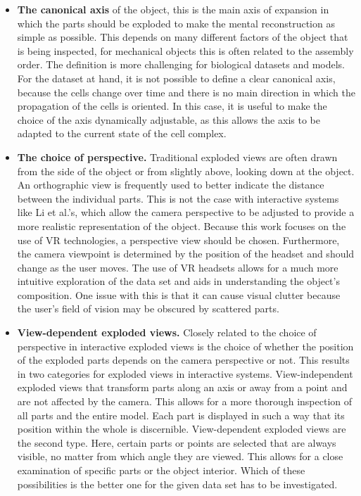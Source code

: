 \begin{itemize}
	\item \textbf{The canonical axis} of the object, this is the main axis of expansion in which the parts should be exploded to make the mental reconstruction as simple as possible. This depends on many different factors of the object that is being inspected, for mechanical objects this is often related to the assembly order. The definition is more challenging for biological datasets and models. For the dataset at hand, it is not possible to define a clear canonical axis, because the cells change over time and there is no main direction in which the propagation of the cells is oriented. In this case, it is useful to make the choice of the axis dynamically adjustable, as this allows the axis to be adapted to the current state of the cell complex. 
	\item \textbf{The choice of perspective.} Traditional exploded views are often drawn from the side of the object or from slightly above, looking down at the object. An orthographic view is frequently used to better indicate the distance between the individual parts. 
	This is not the case with interactive systems like Li et al.'s, which allow the camera perspective to be adjusted to provide a more realistic representation of the object.\cite{Wilmot_Li_2008}
	Because this work focuses on the use of VR technologies, a perspective view should be chosen. 
	Furthermore, the camera viewpoint is determined by the position of the headset and should change as the user moves. 
	The use of VR headsets allows for a much more intuitive exploration of the data set and aids in understanding the object's composition. 
	One issue with this is that it can cause visual clutter because the user's field of vision may be obscured by scattered parts.
	\item \textbf{View-dependent exploded views.} Closely related to the choice of perspective in interactive exploded views is the choice of whether the position of the exploded parts depends on the camera perspective or not. 
	This results in two categories for exploded views in interactive systems.
	View-independent exploded views that transform parts along an axis or away from a point and are not affected by the camera.
	This allows for a more thorough inspection of all parts and the entire model. 
	Each part is displayed in such a way that its position within the whole is discernible.
	View-dependent exploded views are the second type.
	Here, certain parts or points are selected that are always visible, no matter from which angle they are viewed. 
	This allows for a close examination of specific parts or the object interior.
	Which of these possibilities is the better one for the given data set has to be investigated.
\end{itemize}

